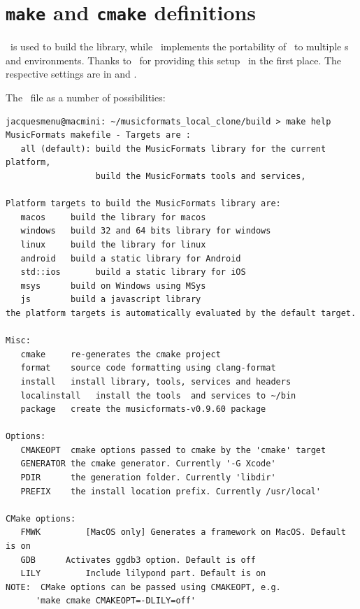 \section{{\tt make} and {\tt cmake} definitions}

\make\ is used to build the library, while \cmake\ implements the portability of \mf\ to multiple \OS s and environments. Thanks to \fober\ for providing this setup \libmusicxml\ in the first place.
The respective settings are in  and .

The \make\ file as a number of possibilities:
\begin{lstlisting}[language=Terminal]
jacquesmenu@macmini: ~/musicformats_local_clone/build > make help
MusicFormats makefile - Targets are :
   all (default): build the MusicFormats library for the current platform,
                  build the MusicFormats tools and services,

Platform targets to build the MusicFormats library are:
   macos     build the library for macos
   windows   build 32 and 64 bits library for windows
   linux     build the library for linux
   android   build a static library for Android
   std::ios       build a static library for iOS
   msys      build on Windows using MSys
   js        build a javascript library
the platform targets is automatically evaluated by the default target.

Misc:
   cmake     re-generates the cmake project
   format    source code formatting using clang-format
   install   install library, tools, services and headers
   localinstall   install the tools  and services to ~/bin
   package   create the musicformats-v0.9.60 package

Options:
   CMAKEOPT  cmake options passed to cmake by the 'cmake' target
   GENERATOR the cmake generator. Currently '-G Xcode'
   PDIR      the generation folder. Currently 'libdir'
   PREFIX    the install location prefix. Currently /usr/local'

CMake options:
   FMWK 		[MacOS only] Generates a framework on MacOS. Default is on
   GDB 		Activates ggdb3 option. Default is off
   LILY 		Include lilypond part. Default is on
NOTE:  CMake options can be passed using CMAKEOPT, e.g.
      'make cmake CMAKEOPT=-DLILY=off'
\end{lstlisting}


